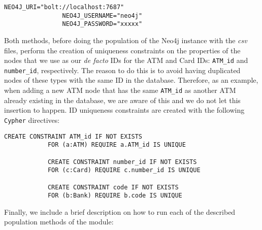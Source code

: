 \begin{center}
\lstset{style=cypherStyle}
\begin{lstlisting}[caption={Example of a \texttt{.env} file, from which the connection credentials will be gathered by our \texttt{populatemodule}.}, label={population-env}]
                NEO4J_URI="bolt://localhost:7687"
                NEO4J_USERNAME="neo4j"
                NEO4J_PASSWORD="xxxxx"
\end{lstlisting}
\end{center}

Both methods, before doing the population of the Neo4j instance with the \emph{csv} files, perform the creation of uniqueness constraints on the properties of the nodes that we use as our \emph{de facto} IDs for the ATM and Card IDs: \texttt{ATM\_id} and \texttt{number\_id}, respectively. The reason to do this is to avoid having duplicated nodes of these types with the same ID in the database. Therefore, as an example, when adding a new ATM node that has the same \texttt{ATM\_id} as another ATM already existing in the database, we are aware of this and we do not let this insertion to happen. ID uniqueness constraints are created with the following \texttt{Cypher} directives:

\begin{center}
\lstset{style=cypherStyle}
\begin{lstlisting}[caption={Uniqueness ID constraints}]
            CREATE CONSTRAINT ATM_id IF NOT EXISTS
            FOR (a:ATM) REQUIRE a.ATM_id IS UNIQUE
    
            CREATE CONSTRAINT number_id IF NOT EXISTS
            FOR (c:Card) REQUIRE c.number_id IS UNIQUE
    
            CREATE CONSTRAINT code IF NOT EXISTS
            FOR (b:Bank) REQUIRE b.code IS UNIQUE
\end{lstlisting}
\end{center}

Finally, we include a brief description on how to run each of the described population methods of the module:

